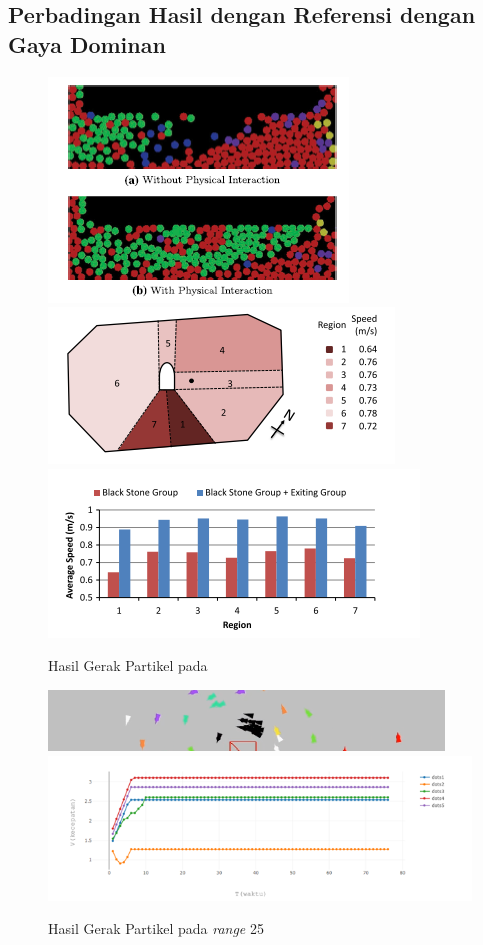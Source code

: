 \subsection{Perbadingan Hasil dengan Referensi dengan Gaya Dominan}%
\begin{figure}
\centering
\includegraphics[scale=0.6]{gambar/Kim2014}
\includegraphics[scale=0.6]{gambar/kimmap.PNG}
\includegraphics[scale=0.6]{gambar/kimgrafik.PNG}
\caption{Hasil Gerak Partikel pada \citep{Kim2014}}
\label{fig:figkim2014}
\end{figure}

\begin{figure}
\centering
\includegraphics[scale=0.6]{gambar/hasilntukdibandingkankim.PNG}
\includegraphics[scale=0.7]{gambar/datagrafik/range25heterogen}
\caption{Hasil Gerak Partikel pada \textit{range} 25}
\label{fig:dominanrange25}
\end{figure}

